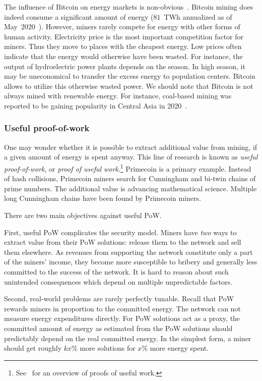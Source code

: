 The influence of Bitcoin on energy markets is non-obvious~\cite{Carter2020}.
Bitcoin mining does indeed consume a significant amount of energy ($81$~TWh annualized as of May~2020~\cite{Rauchs2020}).
However, miners rarely compete for energy with other forms of human activity.
Electricity price is the most important competition factor for miners.
Thus they move to places with the cheapest energy.
Low prices often indicate that the energy would otherwise have been wasted.
For instance, the output of hydroelectric power plants depends on the season.
In high season, it may be uneconomical to transfer the excess energy to population centers.
Bitcoin allows to utilize this otherwise wasted power.
We should note that Bitcoin is not always mined with renewable energy.
For instance, coal-based mining was reported to be gaining popularity in Central Asia in 2020~\cite{8BTCStaff2020}.


\subsubsection*{Useful proof-of-work}

One may wonder whether it is possible to extract additional value from mining, if a given amount of energy is spent anyway.
This line of research is known as \textit{useful proof-of-work}, or \textit{proof of useful work}.\footnote{See~\cite{Ball2017} for an overview of proofs of useful work.}
Primecoin is a primary example.
Instead of hash collisions, Primecoin miners search for Cunningham and bi-twin chains of prime numbers.
The additional value is advancing mathematical science.
Multiple long Cunningham chains have been found by Primecoin miners.

There are two main objectives against useful PoW.

First, useful PoW complicates the security model.
Miners have \textit{two} ways to extract value from their PoW solutions: release them to the network and sell them elsewhere.
As revenues from supporting the network constitute only a part of the miners' income, they become more susceptible to bribery and generally less committed to the success of the network.
It is hard to reason about such unintended consequences which depend on multiple unpredictable factors.

Second, real-world problems are rarely perfectly tunable.
Recall that PoW rewards miners in proportion to the committed energy.
The network can not measure energy expenditures directly.
For PoW solutions act as a proxy, the committed amount of energy as estimated from the PoW solutions should predictably depend on the real committed energy.
In the simplest form, a miner should get roughly $kx\%$ more solutions for $x\%$ more energy spent.

